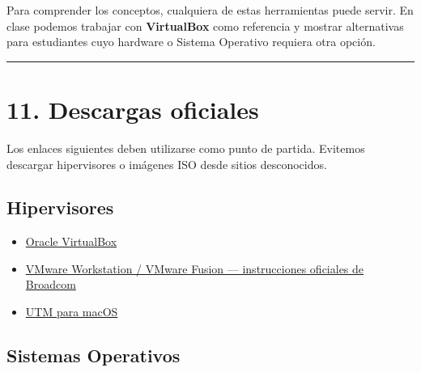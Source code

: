 \documentclass[
  spanish,
  letterpaper,
]{scrbook}
\providecommand{\tightlist}{%
  \setlength{\itemsep}{0pt}\setlength{\parskip}{0pt}}
\begin{document}
\begin{tcolorbox}[enhanced jigsaw, arc=.35mm, bottomrule=.15mm, bottomtitle=1mm, breakable, colback=white, colbacktitle=quarto-callout-tip-color!10!white, colframe=quarto-callout-tip-color-frame, coltitle=black, left=2mm, leftrule=.75mm, opacityback=0, opacitybacktitle=0.6, rightrule=.15mm, title=\textcolor{quarto-callout-tip-color}{\faLightbulb}\hspace{0.5em}{¿Cuál utilizaremos?}, titlerule=0mm, toprule=.15mm, toptitle=1mm]

Para comprender los conceptos, cualquiera de estas herramientas puede
servir. En clase podemos trabajar con \textbf{VirtualBox} como
referencia y mostrar alternativas para estudiantes cuyo hardware o
Sistema Operativo requiera otra opción.

\end{tcolorbox}

\begin{center}\rule{0.5\linewidth}{0.5pt}\end{center}


\chapter{11. Descargas oficiales}\label{descargas-oficiales}

Los enlaces siguientes deben utilizarse como punto de partida. Evitemos
descargar hipervisores o imágenes ISO desde sitios desconocidos.

\section{Hipervisores}\label{hipervisores}

\begin{itemize}
\tightlist
\item
  \href{https://www.virtualbox.org/wiki/Downloads}{Oracle VirtualBox}
\item
  \href{https://knowledge.broadcom.com/external/article/368734/download-desktop-hypervisor-workstation.html}{VMware
  Workstation / VMware Fusion --- instrucciones oficiales de Broadcom}
\item
  \href{https://mac.getutm.app/}{UTM para macOS}
\end{itemize}

\section{Sistemas Operativos}\label{sistemas-operativos}
\end{document}
